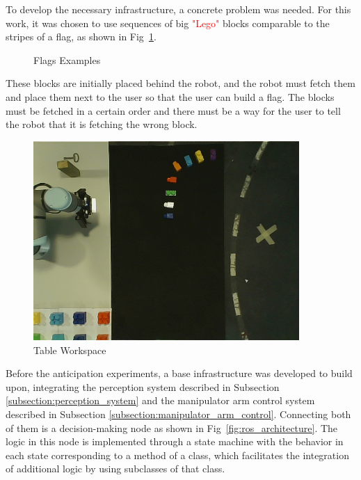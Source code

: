 To develop the necessary infrastructure, a concrete problem was needed. For this work, it was chosen to use sequences of big \textcolor{red}{"Lego"} blocks comparable to the stripes of a flag, as shown in Fig~\ref{fig:flags_examples}.

\begin{figure}[!ht]%
    \centering
    
    \caption{Flags Examples}
    \label{fig:flags_examples}
\end{figure}

These blocks are initially placed behind the robot, and the robot must fetch them and place them next to the user so that the user can build a flag. The blocks must be fetched in a certain order and there must be a way for the user to tell the robot that it is fetching the wrong block.

\begin{figure}[!ht]
\centerline{\includegraphics[width=0.9\textwidth]{figs/table_workspace.png}}
\caption[Table Workspace]{Table Workspace}
\label{fig:table_workspace}
\end{figure}

Before the anticipation experiments, a base infrastructure was developed to build upon, integrating the perception system described in Subsection \ref{subsection:perception_system} and the manipulator arm control system described in Subsection \ref{subsection:manipulator_arm_control}. Connecting both of them is a decision-making node as shown in Fig~\ref{fig:ros_architecture}. The logic in this node is implemented through a state machine with the behavior in each state corresponding to a method of a class, which facilitates the integration of additional logic by using subclasses of that class.

